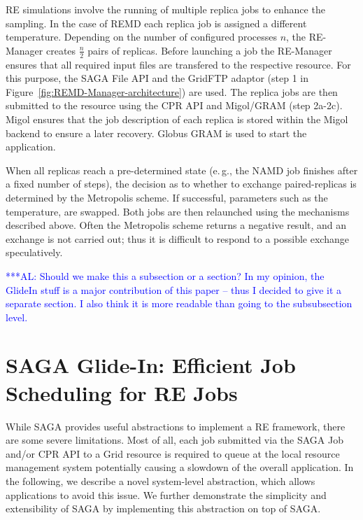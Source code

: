 \documentclass{rspublic}
\newcommand{\alnote}[1]{ {\textcolor{blue} { ***AL: #1 }}}
\newcommand{\alnote}[1]{}
\newcommand{\remanager}[1]{RE-Manager }
\begin{document}
RE simulations involve the running of multiple replica jobs to enhance the sampling. 
In the case of REMD each replica job is assigned a different temperature.  
Depending on the number of configured processes $n$, the \remanager\
creates $\frac{n}{2}$ pairs of replicas.
Before launching a job the \remanager\ ensures that all required input 
files are transfered to the respective resource. For this purpose, the SAGA File API and the
GridFTP adaptor (step 1 in Figure~\ref{fig:REMD-Manager-architecture})
are used.  The replica jobs are then submitted to the resource
using the CPR API and Migol/GRAM (step 2a-2c). Migol ensures that the
job description of each replica is stored within the Migol backend
to ensure a later recovery. Globus GRAM is used to start the
application.

When all replicas reach a pre-determined state (e.\,g., the NAMD job finishes 
after a fixed number of steps), the decision as to whether to exchange
paired-replicas is determined by the Metropolis scheme. If successful,
parameters such as the temperature, are swapped. Both jobs are then
relaunched using the mechanisms described above. Often the Metropolis
scheme returns a negative result, and an exchange is not carried out;
thus it is difficult to respond to a possible exchange speculatively. 
                      
           
\alnote{Should we make this a subsection or a section? In my opinion,
the GlideIn stuff is a major contribution of this paper -- thus I decided to
give it a separate section. I also think it is more readable than going to the
subsubsection level.}           
\section{SAGA Glide-In: Efficient Job Scheduling for RE Jobs}

While SAGA provides useful abstractions to implement a RE framework, there
are some severe limitations. Most of all, each job submitted via the
SAGA Job and/or CPR API to a Grid resource is required to queue at the local 
resource management system potentially causing a slowdown of the overall application. 
In the following, we describe a novel system-level abstraction, which allows 
applications to avoid this issue. We further demonstrate the simplicity and 
extensibility of SAGA by implementing this abstraction on top of SAGA.


\end{document}
